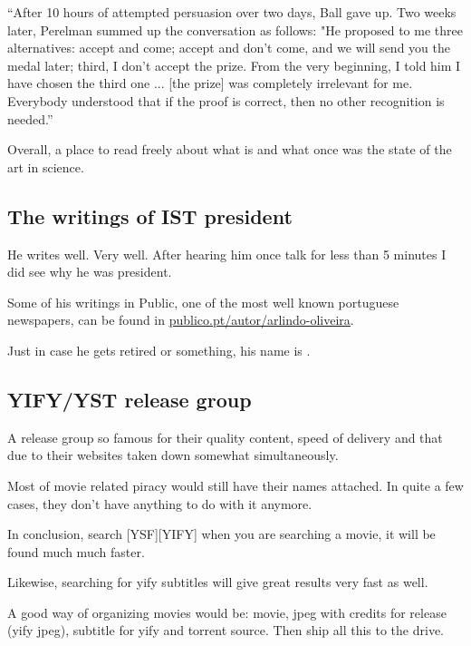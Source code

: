 \begin{center}
    ``After 10 hours of attempted persuasion over two days, Ball gave up. Two weeks later, Perelman summed up the conversation as follows: "He proposed to me three alternatives: accept and come; accept and don't come, and we will send you the medal later; third, I don't accept the prize. From the very beginning, I told him I have chosen the third one ... [the prize] was completely irrelevant for me. Everybody understood that if the proof is correct, then no other recognition is needed.''
\end{center}
\par Overall, a place to read freely about what is and what once was the state of the art in science.

\subsection{The writings of IST president}
\par He writes well. Very well. After hearing him once talk for less than 5 minutes I did see why he was president.
\par Some of his writings in Public, one of the most well known portuguese newspapers, can be found in \href{https://www.publico.pt/autor/arlindo-oliveira}{\ul{publico.pt/autor/arlindo-oliveira}}.
\par Just in case he gets retired or something, his name is .



\subsection{YIFY/YST release group}
A release group so famous for their quality content, speed of delivery and that due to their websites taken down somewhat simultaneously. 

Most of movie related piracy would still have their names attached. In quite a few cases, they don't have anything to do with it anymore. 

In conclusion, search [YSF][YIFY] when you are searching a movie, it will be found much much faster.

Likewise, searching for yify subtitles will give great results very fast as well.

A good way of organizing movies would be: movie, jpeg with credits for release (yify jpeg), subtitle for yify and torrent source. Then ship all this to the drive.

